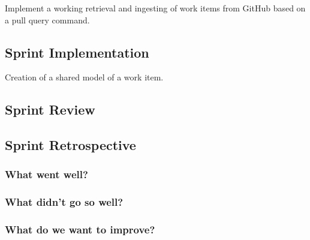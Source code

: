Implement a working retrieval and ingesting of work items from GitHub based on a pull query command.

\subsection{Sprint Implementation}

Creation of a shared model of a work item.

\subsection{Sprint Review}

\subsection{Sprint Retrospective}

\subsubsection{What went well?}

\subsubsection{What didn't go so well?}

\subsubsection{What do we want to improve?}